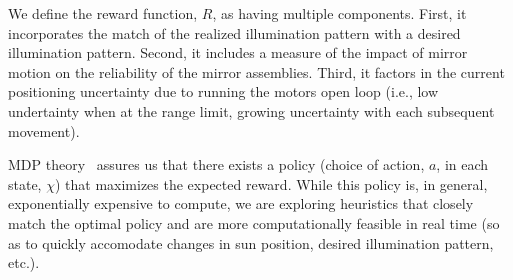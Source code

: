 We define the reward function, $R$, as having multiple components. First,
it incorporates the match of the realized illumination pattern with a
desired illumination pattern. Second, it includes a measure of the impact
of mirror motion on the reliability of the mirror assemblies. Third, it
factors in the current positioning uncertainty due to running the
motors open loop (i.e., low undertainty when at the range limit, growing
uncertainty with each subsequent movement).

MDP theory~\cite{puterman} assures us that there exists a policy (choice
of action, $a$, in each state, $\chi$) that maximizes the expected reward.
While this policy is, in general, exponentially expensive
to compute, we are exploring heuristics that closely match the optimal
policy and are more computationally feasible in real time (so as to quickly
accomodate changes in sun position, desired illumination pattern, etc.).
